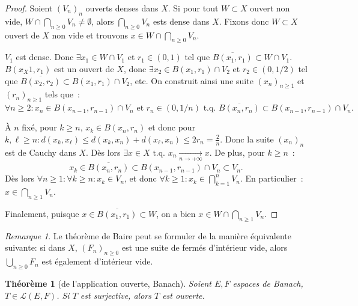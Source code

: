 \documentclass{report}
\newcommand{\tq}{\text{ t.q. }}
\newcommand{\st}{\tq}
\newcommand{\pinfty}{{+\infty}}
\newtheorem{thm}{Théorème}[chapter]
\theoremstyle{definition}
\theoremstyle{remark}
\newtheorem*{rmq}{Remarque}
\begin{document}
\begin{proof} Soient $(V_n)_n$ ouverts denses dans $X$. Si pour tout $W \subset X$ ouvert non vide, $W \cap \bigcap_{n \geq 0}V_n \neq \emptyset$, alors $\bigcap_{n \geq 0}V_n$
ests dense dans $X$. Fixons donc $W \subset X$ ouvert de $X$ non vide et trouvons $x \in W \cap \bigcap_{n \geq 0}V_n$.

$V_1$ est dense. Donc $\exists x_1 \in W \cap V_1$ et $r_1 \in (0, 1)$ tel que $\overline {B(x_1, r_1)} \subset W \cap V_1$. $B(x_X1, r_1)$ est un ouvert de $X$, donc
$\exists x_2 \in B(x_1, r_1) \cap V_2$ et $r_2 \in (0, 1/2)$ tel que $\overline {B(x_2, r_2)} \subset B(x_1, r_1) \cap V_2$, etc. On construit ainsi une suite $(x_n)_{n \geq 1}$
et $(r_n)_{n \geq 1}$ tels que~:
\[\forall n \geq 2 : x_n \in B(x_{n-1}, r_{n-1}) \cap V_n \text{ et } r_n \in (0, 1/n) \st \overline {B(x_n, r_n)} \subset B(x_{n-1}, r_{n-1}) \cap V_n.\]

À $n$ fixé, pour $k \geq n$, $x_k \in B(x_n, r_n)$ et donc pour $k, \ell \geq n : d(x_k, x_\ell) \leq d(x_k, x_n) + d(x_\ell, x_n) \leq 2r_n = \frac 2n$.
Donc la suite $(x_n)_n$ est de Cauchy dans $X$. Dès lors $\exists x \in X \st x_n \xrightarrow[n \to \pinfty]{} x$. De plus, pour $k \geq n$~:
\[x_k \in \overline {B(x_n, r_n)} \subset B(x_{n-1}, r_{n-1}) \cap V_n \subset V_n.\]
Dès lors $\forall n \geq 1 : \forall k \geq n : x_k \in V_n$, et donc $\forall k \geq 1 : x_k \in \bigcap_{k=1}^nV_n$. En particulier~: $x \in \bigcap_{n \geq 1}V_n$.

Finalement, puisque $x \in \overline {B(x_1, r_1)} \subset W$, on a bien $x \in W \cap \bigcap_{n \geq 1}V_n$.
\end{proof}

\begin{rmq} Le théorème de Baire peut se formuler de la manière équivalente suivante: si dans $X$, $(F_n)_{n \geq 0}$ est une suite de fermés d'intérieur vide,
alors $\bigcup_{n \geq 0}F_n$ est également d'intérieur vide.
\end{rmq}

\begin{thm}[de l'application ouverte, Banach] Soient $E, F$ espaces de Banach, $T \in \mathcal L(E, F)$. Si $T$ est surjective, alors $T$ est ouverte.
\end{thm}
\end{document}
